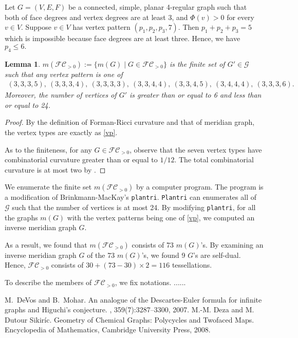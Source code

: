 \documentclass{amsart}
\newtheorem{lemma}{Lemma}
\def\G{\mathcal{G}}
\def\PFC{\mathcal{FC}_{>0}}
\begin{document}
Let $G=(V,E,F)$ be a connected, simple, planar 4-regular graph such that
both of face degrees and vertex degrees are at least 3, and $\Phi(v)>0$ for every
$v\in V$. Suppose $v\in V$ has
vertex pattern $(p_1, p_2, p_3, 7)$.
Then $p_1+p_2+p_3=5$ which is impossible because face degrees are at
least three. Hence, we have $p_4\le 6.$

 \begin{lemma} \label{lem:v}
  $m(\PFC):=\{m(G)\mid G\in\PFC\}$ is the \emph{finite} set of $G'\in\G$ such that
any vertex pattern is one of \begin{align}
(3,3,3,5),\ (3,3,3,4),\ (3,3,3,3),\ (3,3,4,4),\  (3,3,4,5),\
 (3,4,4,4),\ (3,3,3,6). \label{vp}
			     \end{align}
Moreover,   the number of vertices of $G'$ is greater than or equal to 6 and less
       than or equal to 24.
 \end{lemma}


  \begin{proof} By the definition of Forman-Ricci curvature and that of
   meridian graph, the vertex types are exactly as \eqref{vp}.

As to the finiteness, for any $G\in \PFC$,  observe that
the seven vertex types have combinatorial curvature greater than or
 equal to $1/12.$ The total combinatorial curvature is at most two
 by \cite{MR2299456}.
\end{proof}


We enumerate the finite set $m(\PFC)$ by a computer program. The program
is a modification of Brinkmann-MacKay's \texttt{plantri}.
\texttt{Plantri} can enumerates all of $\G$ such that the number of
vertices is at most 24. By modifying \texttt{plantri}, for all the
graphs $m(G)$ with the vertex patterns being one of \eqref{vp}, we
computed an inverse meridian graph $G$.


 As a result, we found that $m(\PFC)$ consists of 73 $m(G)$'s.  By
 examining an inverse meridian graph $G$ of the 73 $m(G)$'s, we found
 9 $G$'s are self-dual.  Hence, $\PFC$ consists of
 $30+(73-30)\times2=116$ tessellations.

  To describe the members of $\PFC$, we fix notations.
......






\begin{thebibliography}{1}

M.~DeVos and B.~Mohar.
\newblock An analogue of the {D}escartes-{E}uler formula for infinite graphs
  and {H}iguchi's conjecture.
, 359(7):3287--3300, 2007.
\bibitem{DS08} M.-M. Deza and  M. Dutour Sikir\'ic. Geometry of Chemical Graphs: Polycycles and Twofaced
Maps. Encyclopedia of Mathematics, Cambridge University Press, 2008.
\end{thebibliography}
\appendix
\end{document}
